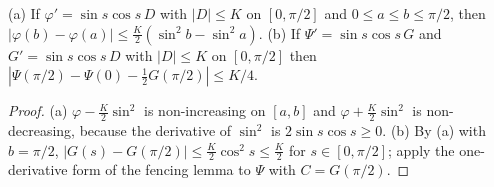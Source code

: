 \begin{lemma}
\label{lem:sg-tal:second-order-calculus}
  \leanok
{}
(a) If $\varphi'=\sin s\cos s\,D$ with $|D|\le K$ on $[0,\pi/2]$ and $0\le a\le b\le\pi/2$, then $|\varphi(b)-\varphi(a)|\le\frac K2(\sin^2b-\sin^2a)$.  (b) If $\Psi'=\sin s\cos s\,G$ and $G'=\sin s\cos s\,D$ with $|D|\le K$ on $[0,\pi/2]$ then $|\Psi(\pi/2)-\Psi(0)-\frac12G(\pi/2)|\le K/4$.
\end{lemma}
\begin{proof}
  \leanok
(a) $\varphi-\frac K2\sin^2$ is non-increasing on $[a,b]$ and $\varphi+\frac K2\sin^2$ is non-decreasing, because the derivative of $\sin^2$ is $2\sin s\cos s\ge0$.  (b) By (a) with $b=\pi/2$, $|G(s)-G(\pi/2)|\le\frac K2\cos^2s\le\frac K2$ for $s\in[0,\pi/2]$; apply the one-derivative form of the fencing lemma to $\Psi$ with $C=G(\pi/2)$.
\end{proof}

